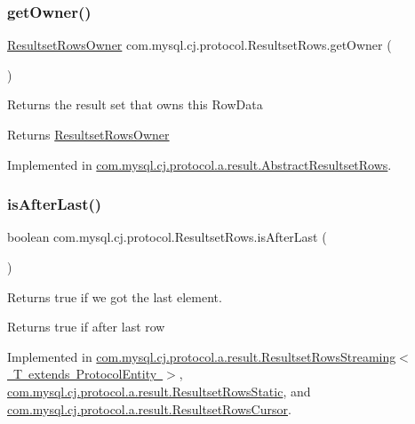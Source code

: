 \subsubsection{\texorpdfstring{get\+Owner()}{getOwner()}}
{\footnotesize\ttfamily \mbox{\hyperlink{interfacecom_1_1mysql_1_1cj_1_1protocol_1_1_resultset_rows_owner}{Resultset\+Rows\+Owner}} com.\+mysql.\+cj.\+protocol.\+Resultset\+Rows.\+get\+Owner (\begin{DoxyParamCaption}{ }\end{DoxyParamCaption})}

Returns the result set that \textquotesingle{}owns\textquotesingle{} this Row\+Data

\begin{DoxyReturn}{Returns}
\mbox{\hyperlink{interfacecom_1_1mysql_1_1cj_1_1protocol_1_1_resultset_rows_owner}{Resultset\+Rows\+Owner}} 
\end{DoxyReturn}


Implemented in \mbox{\hyperlink{classcom_1_1mysql_1_1cj_1_1protocol_1_1a_1_1result_1_1_abstract_resultset_rows_ae7b769392c5668dabf45c80e36ec216e}{com.\+mysql.\+cj.\+protocol.\+a.\+result.\+Abstract\+Resultset\+Rows}}.

\mbox{\label{interfacecom_1_1mysql_1_1cj_1_1protocol_1_1_resultset_rows_a8599e016249b697a11560806dc290a87}} 
\subsubsection{\texorpdfstring{is\+After\+Last()}{isAfterLast()}}
{\footnotesize\ttfamily boolean com.\+mysql.\+cj.\+protocol.\+Resultset\+Rows.\+is\+After\+Last (\begin{DoxyParamCaption}{ }\end{DoxyParamCaption})}

Returns true if we got the last element.

\begin{DoxyReturn}{Returns}
true if after last row 
\end{DoxyReturn}


Implemented in \mbox{\hyperlink{classcom_1_1mysql_1_1cj_1_1protocol_1_1a_1_1result_1_1_resultset_rows_streaming_a87d9941d48a1d379d2387082904ebe6c}{com.\+mysql.\+cj.\+protocol.\+a.\+result.\+Resultset\+Rows\+Streaming$<$ T extends Protocol\+Entity $>$}}, \mbox{\hyperlink{classcom_1_1mysql_1_1cj_1_1protocol_1_1a_1_1result_1_1_resultset_rows_static_a7b010d9bacc8bb948e66a76d4ef4e0d4}{com.\+mysql.\+cj.\+protocol.\+a.\+result.\+Resultset\+Rows\+Static}}, and \mbox{\hyperlink{classcom_1_1mysql_1_1cj_1_1protocol_1_1a_1_1result_1_1_resultset_rows_cursor_a26d45087615e0f6baa7a8b52d33a0ec4}{com.\+mysql.\+cj.\+protocol.\+a.\+result.\+Resultset\+Rows\+Cursor}}.

